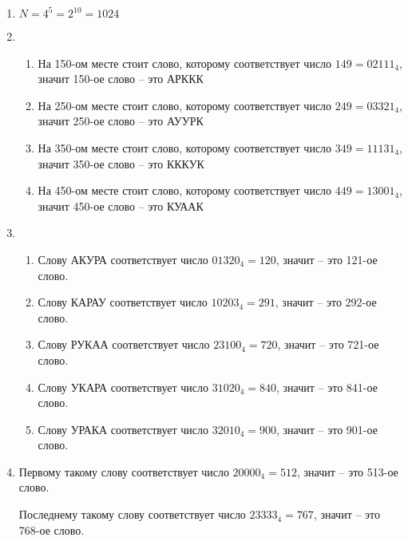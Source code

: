 \begin{enumerate}
  \item $ N = 4^{5} = 2^{10} = 1024 $
  \item 
    \begin{enumerate}
      \item На 150-ом месте стоит слово, которому соответствует число $ 149 = 02111_4 $,
    значит 150-ое слово -- это АРККК
      \item На 250-ом месте стоит слово, которому соответствует число $ 249 = 03321_4 $,
    значит 250-ое слово -- это АУУРК
      \item На 350-ом месте стоит слово, которому соответствует число $ 349 = 11131_4 $,
    значит 350-ое слово -- это КККУК
      \item На 450-ом месте стоит слово, которому соответствует число $ 449 = 13001_4 $,
    значит 450-ое слово -- это КУААК
    \end{enumerate}
  \item
    \begin{enumerate}
      \item Слову АКУРА соответствует число $ 01320_4 = 120 $, значит -- это 121-ое слово.
      \item Слову КАРАУ соответствует число $ 10203_4 = 291 $, значит -- это 292-ое слово.
      \item Слову РУКАА соответствует число $ 23100_4 = 720 $, значит -- это 721-ое слово.
      \item Слову УКАРА соответствует число $ 31020_4 = 840 $, значит -- это 841-ое слово.
      \item Слову УРАКА соответствует число $ 32010_4 = 900 $, значит -- это 901-ое слово.
    \end{enumerate}
  \item
    Первому такому слову соответствует число $ 20000_4 = 512 $, значит -- это 513-ое слово.

    Последнему такому слову соответствует число $ 23333_4 = 767 $, значит -- это 768-ое слово.
\end{enumerate}
